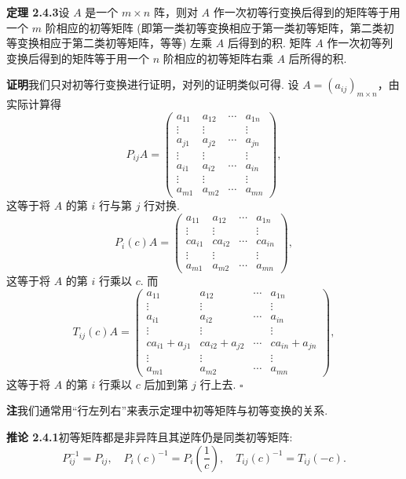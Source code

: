 \documentclass[UTF8, 12pt, fontset=fandol, oneside]{ctexart}
\begin{document}
\noindent\textbf{定理 2.4.3}\quad 设 $A$ 是一个 $m\times n$ 阵，则对 $A$ 作一次初等行变换后得到的矩阵等于用一个 $m$ 阶相应的初等矩阵 (即第一类初等变换相应于第一类初等矩阵，第二类初等变换相应于第二类初等矩阵，等等) 左乘 $A$ 后得到的积. 矩阵 $A$ 作一次初等列变换后得到的矩阵等于用一个 $n$ 阶相应的初等矩阵右乘 $A$ 后所得的积.

\noindent\textbf{证明}\quad 我们只对初等行变换进行证明，对列的证明类似可得. 设 $A=(a_{ij})_{m\times n}$，由实际计算得
\[
P_{ij}A=
\left(\begin{array}{cccc}
a_{11} & a_{12} & \cdots & a_{1n}\\
\vdots & \vdots & & \vdots\\
a_{j1} & a_{j2} & \cdots & a_{jn}\\
\vdots & \vdots & & \vdots\\
a_{i1} & a_{i2} & \cdots & a_{in}\\
\vdots & \vdots & & \vdots\\
a_{m1} & a_{m2} & \cdots & a_{mn}
\end{array}\right),
\]
这等于将 $A$ 的第 $i$ 行与第 $j$ 行对换.
\[
P_i(c)A=
\left(\begin{array}{cccc}
a_{11} & a_{12} & \cdots & a_{1n}\\
\vdots & \vdots & & \vdots\\
ca_{i1} & ca_{i2} & \cdots & ca_{in}\\
\vdots & \vdots & & \vdots\\
a_{m1} & a_{m2} & \cdots & a_{mn}
\end{array}\right),
\]
这等于将 $A$ 的第 $i$ 行乘以 $c$. 而
\[
T_{ij}(c)A=
\left(\begin{array}{cccc}
a_{11} & a_{12} & \cdots & a_{1n}\\
\vdots & \vdots & & \vdots\\
a_{i1} & a_{i2} & \cdots & a_{in}\\
\vdots & \vdots & & \vdots\\
ca_{i1}+a_{j1} & ca_{i2}+a_{j2} & \cdots & ca_{in}+a_{jn}\\
\vdots & \vdots & & \vdots\\
a_{m1} & a_{m2} & \cdots & a_{mn}
\end{array}\right),
\]
这等于将 $A$ 的第 $i$ 行乘以 $c$ 后加到第 $j$ 行上去. $\square$

\noindent\textbf{注}\quad 我们通常用“行左列右”来表示定理中初等矩阵与初等变换的关系.

\noindent\textbf{推论 2.4.1}\quad 初等矩阵都是非异阵且其逆阵仍是同类初等矩阵:
\[
P_{ij}^{-1}=P_{ij},\quad P_i(c)^{-1}=P_i\left(\frac{1}{c}\right),\quad T_{ij}(c)^{-1}=T_{ij}(-c).
\]
\end{document}
